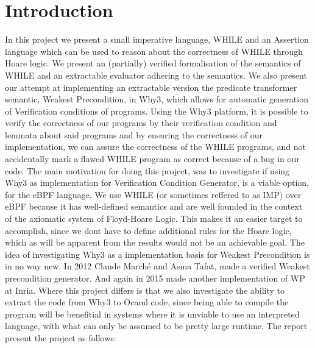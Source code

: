 \section{Introduction}

In this project we present a small imperative language, WHILE and an Assertion language which can be used to reason about the correctness of WHILE through Hoare logic.
We present an (partially) verified formalisation of the semantics of WHILE and an extractable evaluator adhering to the semantics.
We also present our attempt at implementing an extractable version the predicate transformer semantic, Weakest Precondition, in Why3, which allows for automatic generation of Verification conditions of programs.
Using the Why3 platform, it is possible to verify the correctness of our programs by their verification condition and lemmata about said programs and by ensuring the correctness of our implementation,
we can assure the correctness of the WHILE programs, and not accidentally mark a flawed WHILE program as correct
because of a bug in our code.
The main motivation for doing this project, was to investigate if using Why3 as implementation for Verification Condition Generator, is a viable option, for the eBPF language.
We use WHILE (or sometimes reffered to as IMP) over eBPF because it has well-defined semantics and are well founded in the context of the axiomatic system of Floyd-Hoare Logic.
This makes it an easier target to accomplish, since we dont have to define additional rules for the Hoare logic, which as will be apparent from the results would not be an achievable goal.
The idea of investigating Why3 as a implementation basis for Weakest Precondition is in no way new.
In 2012 Claude Marché and Asma Tafat, made a verified Weakest precondition generator\cite{wp-revisited}.
And again in 2015 made another implementation of WP at Inria\cite{wp2}.
Where this project differs is that we also investigate the ability to extract the code from Why3 to Ocaml code,
since being able to compile the program will be benefitial in systems where it is unviable to use an interpreted language, with what can only be assumed to be pretty large runtime.
The report present the project as follows:

